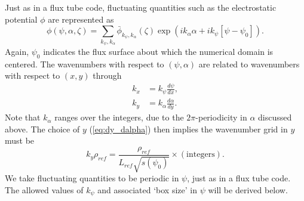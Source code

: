 \documentclass[11pt,letter]{article}
\begin{document}
Just as in a flux tube code, fluctuating quantities such as the electrostatic potential $\phi$ are represented as
\begin{equation}
\phi(\psi,\alpha,\zeta)
=\sum_{k_\psi, k_\alpha} \bar{\phi}_{k_\psi,k_\alpha}(\zeta) \exp\left( i k_\alpha \alpha + i k_\psi \left[ \psi - \psi_0\right] \right).
\label{eq:fluctuations}
\end{equation}
Again, $\psi_0$ indicates the flux surface about which the numerical domain is centered.
The wavenumbers with respect to $(\psi,\alpha)$ are related to wavenumbers with respect to $(x,y)$ through
\begin{align}
\label{eq:k_conversion}
k_x &= k_\psi \frac{d\psi}{dx}, \\
k_y &= k_\alpha \frac{d\alpha}{dy} \nonumber.
\end{align}
Note that $k_\alpha$ ranges over the integers, due to the $2\pi$-periodicity in $\alpha$ discussed above.
The choice of $y$ (\ref{eq:dy_dalpha}) then implies the wavenumber grid in $y$ must be
\begin{equation}
k_y \rho_{ref} = \frac{\rho_{ref}}{L_{ref} \sqrt{s(\psi_0)}} \times (\mathrm{integers}).
\end{equation}
We take fluctuating quantities to be periodic in $\psi$, just as in a flux tube code. The allowed values of $k_\psi$ and associated `box size' in $\psi$
will be derived below.
\end{document}
